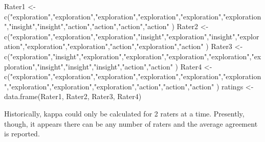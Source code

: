 \documentclass[
  english,
]{book}
\newenvironment{Shaded}{\begin{snugshade}}{\end{snugshade}}
\newcommand{\FunctionTok}[1]{\textcolor[rgb]{0.00,0.00,0.00}{#1}}
\newcommand{\NormalTok}[1]{#1}
\newcommand{\OtherTok}[1]{\textcolor[rgb]{0.56,0.35,0.01}{#1}}
\newcommand{\StringTok}[1]{\textcolor[rgb]{0.31,0.60,0.02}{#1}}
\begin{document}
\begin{Shaded}
\begin{Highlighting}[]
\NormalTok{Rater1 }\OtherTok{\textless{}{-}} \FunctionTok{c}\NormalTok{(}\StringTok{"exploration"}\NormalTok{,}\StringTok{"exploration"}\NormalTok{,}\StringTok{"exploration"}\NormalTok{,}\StringTok{"exploration"}\NormalTok{,}\StringTok{"exploration"}\NormalTok{,}\StringTok{"exploration"}\NormalTok{,}\StringTok{"insight"}\NormalTok{,}\StringTok{"insight"}\NormalTok{,}\StringTok{"action"}\NormalTok{,}\StringTok{"action"}\NormalTok{,}\StringTok{"action"}\NormalTok{,}\StringTok{"action"}\NormalTok{ )}
\NormalTok{Rater2 }\OtherTok{\textless{}{-}} \FunctionTok{c}\NormalTok{(}\StringTok{"exploration"}\NormalTok{,}\StringTok{"exploration"}\NormalTok{,}\StringTok{"exploration"}\NormalTok{,}\StringTok{"insight"}\NormalTok{,}\StringTok{"exploration"}\NormalTok{,}\StringTok{"insight"}\NormalTok{,}\StringTok{"exploration"}\NormalTok{,}\StringTok{"exploration"}\NormalTok{,}\StringTok{"exploration"}\NormalTok{,}\StringTok{"action"}\NormalTok{,}\StringTok{"exploration"}\NormalTok{,}\StringTok{"action"}\NormalTok{ )}
\NormalTok{Rater3 }\OtherTok{\textless{}{-}} \FunctionTok{c}\NormalTok{(}\StringTok{"exploration"}\NormalTok{,}\StringTok{"insight"}\NormalTok{,}\StringTok{"exploration"}\NormalTok{,}\StringTok{"exploration"}\NormalTok{,}\StringTok{"exploration"}\NormalTok{,}\StringTok{"exploration"}\NormalTok{,}\StringTok{"exploration"}\NormalTok{,}\StringTok{"insight"}\NormalTok{,}\StringTok{"insight"}\NormalTok{,}\StringTok{"insight"}\NormalTok{,}\StringTok{"action"}\NormalTok{,}\StringTok{"action"}\NormalTok{ )}
\NormalTok{Rater4 }\OtherTok{\textless{}{-}} \FunctionTok{c}\NormalTok{(}\StringTok{"exploration"}\NormalTok{,}\StringTok{"exploration"}\NormalTok{,}\StringTok{"exploration"}\NormalTok{,}\StringTok{"exploration"}\NormalTok{,}\StringTok{"exploration"}\NormalTok{,}\StringTok{"exploration"}\NormalTok{,}\StringTok{"exploration"}\NormalTok{,}\StringTok{"exploration"}\NormalTok{,}\StringTok{"exploration"}\NormalTok{,}\StringTok{"action"}\NormalTok{,}\StringTok{"action"}\NormalTok{,}\StringTok{"action"}\NormalTok{ )}
\NormalTok{ratings }\OtherTok{\textless{}{-}} \FunctionTok{data.frame}\NormalTok{(Rater1, Rater2, Rater3, Rater4)}
\end{Highlighting}
\end{Shaded}

Historically, kappa could only be calculated for 2 raters at a time. Presently, though, it appears there can be any number of raters and the average agreement is reported.
\end{document}
